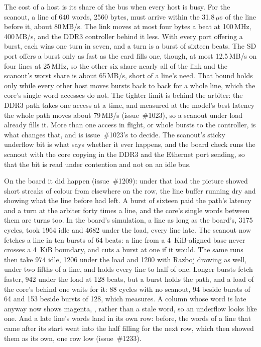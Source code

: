 \documentclass[journal,onecolumn,9pt]{IEEEtran}
\begin{document}
The cost of a host is its share of the bus when every host is busy.
For the scanout, a line of 640 words, 2560 bytes, must arrive within
the 31.8\,$\mu$s of the line before it, about 80\,MB/s. The link
moves at most four bytes a beat at 100\,MHz, 400\,MB/s, and the DDR3
controller behind it less. With every port offering a burst, each
wins one turn in seven, and a turn is a burst of sixteen beats. The
SD port offers a burst only as fast as the card fills one, though,
at most 12.5\,MB/s on four lines at 25\,MHz, so the other six share
nearly all of the link and the scanout's worst share is about
65\,MB/s, short of a line's need. That bound holds only while
every other host moves bursts back to back for a whole line, which
the core's single-word accesses do not. The tighter limit is behind
the arbiter: the DDR3 path takes one access at a time, and measured
at the model's best latency the whole path moves about 79\,MB/s
(issue~\#1023), so a scanout under load already fills it. More than
one access in flight, or whole bursts to the controller, is what
changes that, and is issue~\#1023's to decide.
The scanout's sticky underflow bit is what says whether it ever
happens, and the board check runs the scanout with the core copying
in the DDR3 and the Ethernet port sending, so that the bit is read
under contention and not on an idle bus.

On the board it did happen (issue~\#1209): under that load the
picture showed short streaks of colour from elsewhere on the row, the
line buffer running dry and showing what the line before had left. A
burst of sixteen paid the path's latency and a turn at the arbiter
forty times a line, and the core's single words between them are turns
too. In the board's simulation, a line as long as the board's, 3175
cycles, took 1964 idle and 4682 under the load, every line late. The
scanout now fetches a line in ten bursts of 64 beats: a line from a
4~KiB-aligned base never crosses a 4~KiB boundary, and
 cuts a burst at one if it would. The same runs then
take 974 idle, 1206 under the load and 1200 with Razboj drawing as
well, under two fifths of a line, and
 holds every
line to half of one. Longer bursts fetch faster, 942 under the load
at 128 beats, but a burst holds the path, and a load of the core's
behind one waits for it: 88 cycles with no scanout, 94 beside bursts
of 64 and 153 beside bursts of 128, which
 measures. A column whose word is late anyway now shows
magenta, , rather than a stale word, so an underflow looks
like one. And a late line's words land in its own row: before, the
words of a line that came after its start went into the half filling
for the next row, which then showed them as its own, one row low
(issue~\#1233).
\end{document}
